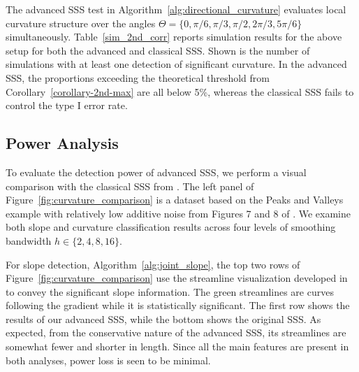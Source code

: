 \documentclass{article}
\begin{document}
The advanced SSS test in Algorithm~\ref{alg:directional_curvature} evaluates local  curvature structure over the angles $\Theta = \{0, \pi/6, \pi/3, \pi/2, 2\pi/3, 5\pi/6\}$ simultaneously.   Table~\ref{sim_2nd_corr} reports simulation results for the above setup for both the advanced and classical SSS. Shown is the number of simulations with at least one detection of significant curvature. In the advanced SSS, the proportions exceeding the theoretical threshold from Corollary~\ref{corollary-2nd-max} are all below 5\%, whereas the classical SSS fails to control the type I error rate.    %




\subsection{Power Analysis}
\label{subsec-power}
To evaluate the detection power of advanced SSS, we perform a visual comparison with the classical SSS from \citet{godtliebsen2004statistical}. The left panel of Figure~\ref{fig:curvature_comparison} is a dataset based on the Peaks and Valleys example with relatively low additive noise from Figures 7 and 8 of \citet{godtliebsen2004statistical}. We examine both slope and curvature classification results across four levels of smoothing bandwidth $h\in\{2,4,8,16\}$.

For slope detection, Algorithm~\ref{alg:joint_slope}, the top two rows of Figure~\ref{fig:curvature_comparison} use the streamline visualization  developed in \citet{godtliebsen2004statistical} to convey the significant slope information. The green streamlines are curves following the gradient while it is statistically significant. %
The first row shows the results of our advanced SSS, while the bottom shows the original SSS. As expected, from the conservative nature of the advanced SSS, its streamlines are somewhat fewer and shorter in length. Since all the main features are present in both analyses, power loss is seen to be minimal. 
\end{document}
